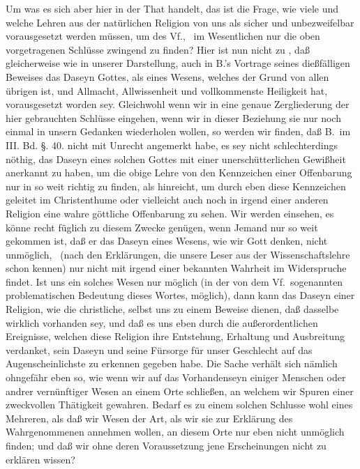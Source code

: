 Um was es sich aber hier in der That handelt, das ist die Frage, wie viele und welche Lehren aus der natürlichen Religion von uns als sicher und unbezweifelbar vorausgesetzt werden müssen, um des Vf., \dh\  im Wesentlichen nur die oben vorgetragenen Schlüsse zwingend zu finden? Hier ist nun nicht zu , daß gleicherweise wie in unserer Darstellung, auch in B.'s Vortrage seines dießfälligen Beweises das Daseyn Gottes, als eines Wesens, welches der Grund von allen übrigen ist, und Allmacht, Allwissenheit und vollkommenste Heiligkeit hat, vorausgesetzt worden sey. Gleichwohl wenn wir in eine genaue Zergliederung der hier gebrauchten Schlüsse eingehen, wenn wir in dieser Beziehung sie nur noch einmal in unsern Gedanken wiederholen wollen, so werden wir finden, daß B.\ im III. Bd. §. 40. nicht mit Unrecht angemerkt habe, es sey nicht schlechterdings nöthig, das Daseyn eines solchen Gottes mit einer unerschütterlichen Gewißheit anerkannt zu haben, um die obige Lehre von den Kennzeichen einer Offenbarung nur in so weit richtig zu finden, als hinreicht, um durch eben diese Kennzeichen geleitet im Christenthume oder vielleicht auch noch in irgend einer anderen Religion eine wahre göttliche Offenbarung zu sehen. Wir werden einsehen, es könne recht füglich zu diesem Zwecke genügen, wenn Jemand nur so weit gekommen ist, daß er das Daseyn eines Wesens, wie wir Gott denken, nicht unmöglich, \dh\  (nach den Erklärungen, die unsere Leser aus der Wissenschaftslehre schon kennen) nur nicht mit irgend einer bekannten Wahrheit im Widerspruche findet. Ist uns ein solches Wesen nur möglich (in der von dem Vf.\ sogenannten problematischen Bedeutung dieses Wortes, möglich), dann kann das Daseyn einer  Religion, wie die christliche, selbst uns zu einem Beweise dienen, daß dasselbe wirklich vorhanden sey, und daß es uns eben durch die außerordentlichen Ereignisse, welchen diese Religion ihre Entstehung, Erhaltung und Ausbreitung verdanket, sein Daseyn und seine Fürsorge für unser Geschlecht auf das Augenscheinlichste zu erkennen gegeben habe. Die Sache verhält sich nämlich ohngefähr eben so, wie wenn wir auf das Vorhandenseyn einiger Menschen oder andrer vernünftiger Wesen an einem Orte schließen, an welchem wir Spuren einer zweckvollen Thätigkeit gewahren. Bedarf es zu einem solchen Schlusse wohl eines Mehreren, als daß wir Wesen der Art, als wir sie zur Erklärung des Wahrgenommenen annehmen wollen, an diesem Orte nur eben nicht unmöglich finden; und daß wir ohne deren Voraussetzung jene Erscheinungen nicht zu erklären wissen? \par
